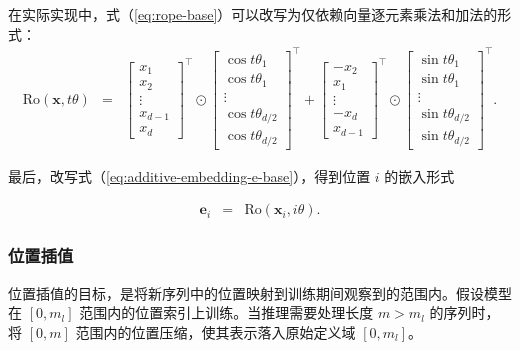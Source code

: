 在实际实现中，式（\ref{eq:rope-base}）可以改写为仅依赖向量逐元素乘法和加法的形式：
\begin{eqnarray}
\mathrm{Ro}(\mathbf{x},t\theta) & = & \begin{bmatrix} x_1 \\ x_2 \\ \vdots \\ x_{d-1} \\ x_{d} \end{bmatrix}^\top \odot \begin{bmatrix} \cos t\theta_1 \\ \cos t\theta_1 \\ \vdots \\ \cos t\theta_{d/2} \\ \cos t\theta_{d/2} \end{bmatrix}^\top + \begin{bmatrix} -x_2 \\ x_1 \\ \vdots \\ -x_{d} \\ x_{d-1} \end{bmatrix}^\top \odot \begin{bmatrix} \sin t\theta_1 \\ \sin t\theta_1 \\ \vdots \\ \sin t\theta_{d/2} \\ \sin t\theta_{d/2} \end{bmatrix}^\top \label{eq:rope-simple}.
\end{eqnarray}

最后，改写式（\ref{eq:additive-embedding-e-base}），得到位置 $i$ 的嵌入形式

\begin{eqnarray}
\mathbf{e}_i & = & \mathrm{Ro}(\mathbf{x}_i,i\theta).
\end{eqnarray}

\subsubsection{位置插值}

\noindent 位置插值的目标，是将新序列中的位置映射到训练期间观察到的范围内。假设模型在 $[0, m_l]$ 范围内的位置索引上训练。当推理需要处理长度 $m > m_l$ 的序列时，将 $[0,m]$ 范围内的位置压缩，使其表示落入原始定义域 $[0,m_l]$。

